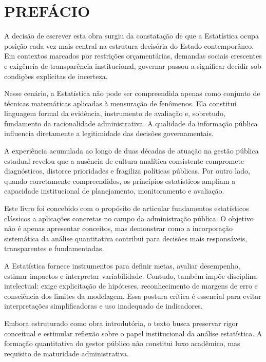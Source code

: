 \chapter*{PREFÁCIO}

A decisão de escrever esta obra surgiu da constatação de que a Estatística ocupa posição cada vez mais central na estrutura decisória do Estado contemporâneo. Em contextos marcados por restrições orçamentárias, demandas sociais crescentes e exigência de transparência institucional, governar passou a significar decidir sob condições explícitas de incerteza.  \vskip0.3cm

Nesse cenário, a Estatística não pode ser compreendida apenas como conjunto de técnicas matemáticas aplicadas à mensuração de fenômenos. Ela constitui linguagem formal da evidência, instrumento de avaliação e, sobretudo, fundamento da racionalidade administrativa. A qualidade da informação pública influencia diretamente a legitimidade das decisões governamentais. \vskip0.3cm

A experiência acumulada ao longo de duas décadas de atuação na gestão pública estadual revelou que a ausência de cultura analítica consistente compromete diagnósticos, distorce prioridades e fragiliza políticas públicas. Por outro lado, quando corretamente compreendidos, os princípios estatísticos ampliam a capacidade institucional de planejamento, monitoramento e avaliação. \vskip0.3cm

Este livro foi concebido com o propósito de articular fundamentos estatísticos clássicos a aplicações concretas no campo da administração pública. O objetivo não é apenas apresentar conceitos, mas demonstrar como a incorporação sistemática da análise quantitativa contribui para decisões mais responsáveis, transparentes e fundamentadas. \vskip0.3cm

A Estatística fornece instrumentos para definir metas, avaliar desempenho, estimar impactos e interpretar variabilidade. Contudo, também impõe disciplina intelectual: exige explicitação de hipóteses, reconhecimento de margens de erro e consciência dos limites da modelagem. Essa postura crítica é essencial para evitar interpretações simplificadoras e uso inadequado de indicadores. \vskip0.3cm

Embora estruturado como obra introdutória, o texto busca preservar rigor conceitual e estimular reflexão sobre o papel institucional da análise estatística. A formação quantitativa do gestor público não constitui luxo acadêmico, mas requisito de maturidade administrativa. \vskip0.3cm

